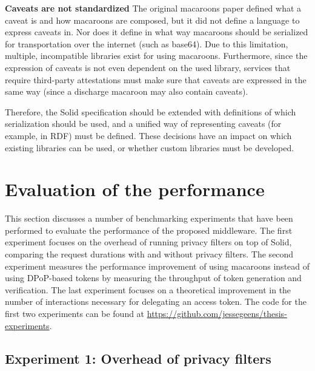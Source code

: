 \noindent \textbf{Caveats are not standardized} The original macaroons paper defined what a caveat is and how macaroons are composed, but it did not define a language to express caveats in. Nor does it define in what way macaroons should be serialized for transportation over the internet (such as base64). Due to this limitation, multiple, incompatible libraries exist for using macaroons. Furthermore, since the expression of caveats is not even dependent on the used library, services that require third-party attestations must make sure that caveats are expressed in the same way (since a discharge macaroon may also contain caveats). 

Therefore, the Solid specification should be extended with definitions of which serialization should be used, and a unified way of representing caveats (for example, in \gls{RDF}) must be defined. These decisions have an impact on which existing libraries can be used, or whether custom libraries must be developed.


\section{Evaluation of the performance}
This section discusses a number of benchmarking experiments that have been performed to evaluate the performance of the proposed middleware. The first experiment focuses on the overhead of running privacy filters on top of Solid, comparing the request durations with and without privacy filters. The second experiment measures the performance improvement of using macaroons instead of using \gls{DPoP}-based tokens by measuring the throughput of token generation and verification. The last experiment focuses on a theoretical improvement in the number of interactions necessary for delegating an access token. The code for the first two experiments can be found at \url{https://github.com/jessegeens/thesis-experiments}.

\subsection{Experiment 1: Overhead of privacy filters}
\label{sec:privacy-filter-performance}

